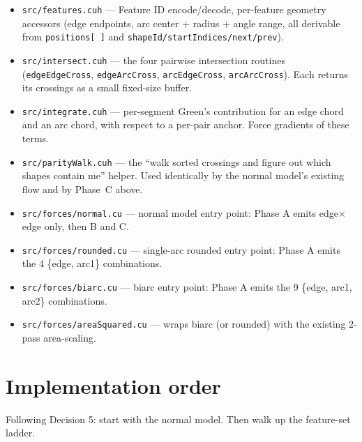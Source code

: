 \documentclass[11pt]{article}
\newcommand{\code}[1]{\texttt{#1}}
\begin{document}
\begin{itemize}[leftmargin=*]
  \item \code{src/features.cuh} --- Feature ID encode/decode,
        per-feature geometry accessors (edge endpoints, arc center +
        radius + angle range, all derivable from \code{positions[\,]}
        and \code{shapeId/startIndices/next/prev}).
  \item \code{src/intersect.cuh} --- the four pairwise intersection
        routines (\code{edgeEdgeCross}, \code{edgeArcCross},
        \code{arcEdgeCross}, \code{arcArcCross}). Each returns its
        crossings as a small fixed-size buffer.
  \item \code{src/integrate.cuh} --- per-segment Green's contribution
        for an edge chord and an arc chord, with respect to a per-pair
        anchor. Force gradients of these terms.
  \item \code{src/parityWalk.cuh} --- the ``walk sorted crossings and
        figure out which shapes contain me'' helper. Used identically
        by the normal model's existing flow and by Phase~C above.
  \item \code{src/forces/normal.cu} --- normal model entry point:
        Phase A emits edge$\times$edge only, then B and C.
  \item \code{src/forces/rounded.cu} --- single-arc rounded entry
        point: Phase A emits the 4 \{edge, arc1\} combinations.
  \item \code{src/forces/biarc.cu} --- biarc entry point: Phase A
        emits the 9 \{edge, arc1, arc2\} combinations.
  \item \code{src/forces/areaSquared.cu} --- wraps biarc (or rounded)
        with the existing 2-pass area-scaling.
\end{itemize}

\section{Implementation order}\label{sec:order}

Following Decision 5: start with the normal model. Then walk up the
feature-set ladder.
\end{document}

